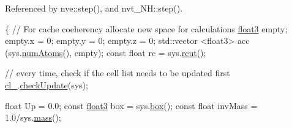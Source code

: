 Referenced by nve\-::step(), and nvt\-\_\-\-N\-H\-::step().


\begin{DoxyCode}
                                                 \{
    \textcolor{comment}{// For cache coeherency allocate new space for calculations}
    \hyperlink{structfloat3}{float3} empty;
    empty.x = 0; empty.y = 0; empty.z = 0;
    std::vector <float3> acc (sys.\hyperlink{classsystem_definition_ae8d3c2df2d56241cee03fcc4e2026ae0}{numAtoms}(), empty);
    \textcolor{keyword}{const} \textcolor{keywordtype}{float} rc = sys.\hyperlink{classsystem_definition_acacd88aac7d451bdcf9779ae8c5a95c7}{rcut}();

    \textcolor{comment}{// every time, check if the cell list needs to be updated first}
    \hyperlink{classintegrator_ad1f7813c9cf3c31898aa7d78fc22232a}{cl\_}.\hyperlink{classcell_list__cpu_a70568e6a2012eb8592f2798b3260c550}{checkUpdate}(sys);

    \textcolor{keywordtype}{float} Up = 0.0;
    \textcolor{keyword}{const} \hyperlink{structfloat3}{float3} box = sys.\hyperlink{classsystem_definition_a85b80dee3609ddb68e370cee3fa959ea}{box}();
    \textcolor{keyword}{const} \textcolor{keywordtype}{float} invMass = 1.0/sys.\hyperlink{classsystem_definition_acb6dd3df121e3e5bc0eb41c32bd937bd}{mass}();
    

\end{DoxyCode}
